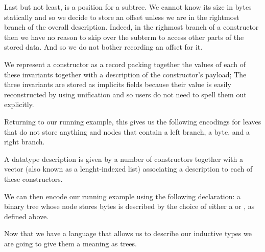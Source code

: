 Last but not least,  is a position for a subtree.
We cannot know its size in bytes statically and so we decide to store
an offset unless we are in the rightmost branch of the overall description.
%
Indeed, in the righmost branch of a constructor then we have no reason to
skip over the subterm to access other parts of the stored data. And so we
do not bother recording an offset for it.

\medskip

We represent a constructor as a record packing together the values of each
of these invariants together with a description of the constructor's payload;
The three invariants are stored as implicits fields because their value is
easily reconstructed by \idris{} using unification and so users do not need
to spell them out explicitly.


Returning to our running example, this gives us the following encodings for
leaves that do not store anything
and nodes that contain a left branch, a byte, and a right branch.


A datatype description is given by a number of constructors together with
a vector (also known as a lenght-indexed list) associating a description
to each of these constructors.


We can then encode our running example using the following 
declaration: a binary tree whose node stores bytes is described by the choice
of either a  or , as defined above.


Now that we have a language that allows us to describe our inductive types
we are going to give them a meaning as trees.
